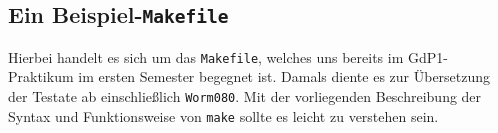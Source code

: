 \clearpage \subsection{Ein Beispiel-\texttt{Makefile}}
\label{subsubsection:examplemakefile} 

Hierbei handelt es sich um das \texttt{Makefile}, welches uns bereits im
GdP1-Praktikum im ersten Semester begegnet ist. Damals diente es zur Übersetzung
der Testate ab einschließlich \texttt{Worm080}. Mit der vorliegenden
Beschreibung der Syntax und Funktionsweise von \texttt{make} sollte es leicht zu
verstehen sein.

{
\footnotesize
\inputminted[linenos=true,stepnumber=5]{make}{../code/Worm080_Makefile}
}
